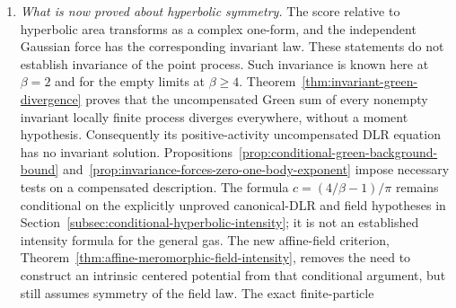 \documentclass[11pt,a4paper]{article}
\numberwithin{equation}{section}
\theoremstyle{definition}
\theoremstyle{remark}
\begin{document}
\begin{enumerate}
probability. This theorem concerns the Bergman law and does not prove
uniqueness among all solutions of a specified infinite-volume equation.
For other $0<\beta<4$, a Green interaction is now identified on the
augmented space. Recovering its exterior field from the unmarked
exterior and determining the relative conditional count weights remain
unproved. Explicit finite-particle solutions show why the canonical
equations alone do not give uniqueness; the new almost sure
infiniteness theorem excludes those examples as actual gas limits.
The stronger Theorem~\ref{thm:infinite-green-canonical-nonuniqueness}
constructs distinct infinite, rotationally invariant position laws
satisfying the same canonical Green equations for every $0<\beta<4$.
For $0<\beta\le2$, their finite Blaschke mass makes them mutually
singular with every actual gas limit. Thus uniqueness of the canonical
specification fails, while uniqueness of the original limiting
sequence remains a separate question. Canonical-tail extremality and
position-changing decompositions are characterized in
Theorem~\ref{thm:canonical-tail-extremality}.
Proposition~\ref{prop:local-poisson-equivalence} shows that all
nontrivial actual candidates are nevertheless locally equivalent to
area Poisson; this does not establish equality of their laws.
\item \emph{What is now proved about hyperbolic symmetry.}
The score relative to hyperbolic area transforms as a complex one-form,
and the independent Gaussian force has the corresponding invariant law.
These statements do not establish invariance of the point process.
Such invariance is known here at $\beta=2$ and for the empty limits
at $\beta\ge4$. Theorem~\ref{thm:invariant-green-divergence} proves
that the uncompensated Green sum of every nonempty invariant locally
finite process diverges everywhere, without a moment hypothesis.
Consequently its positive-activity uncompensated DLR equation has no
invariant solution. Propositions~\ref{prop:conditional-green-background-bound}
and~\ref{prop:invariance-forces-zero-one-body-exponent} impose
necessary tests on a compensated description. The formula
$c=(4/\beta-1)/\pi$ remains conditional on the explicitly unproved
canonical-DLR and field hypotheses in
Section~\ref{subsec:conditional-hyperbolic-intensity}; it is not an
established intensity formula for the general gas. The new affine-field
criterion, Theorem~\ref{thm:affine-meromorphic-field-intensity}, removes
the need to construct an intrinsic centered potential from that conditional
argument, but still assumes symmetry of the field law. The exact finite-particle

\end{enumerate}
\end{document}
